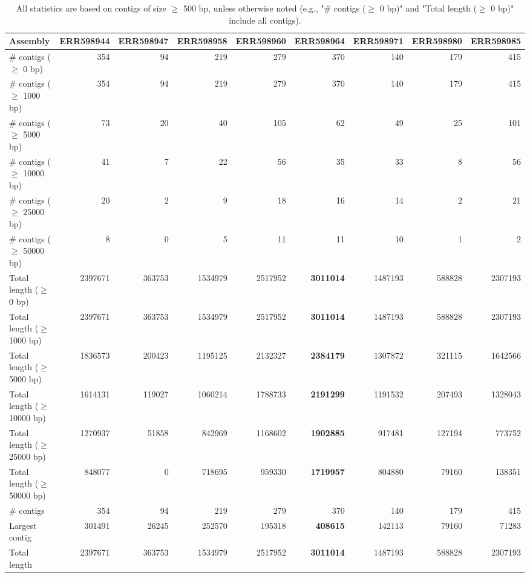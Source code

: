 \documentclass[12pt,a4paper]{article}
\begin{document}
\begin{table}[ht]
\begin{center}
\caption{All statistics are based on contigs of size $\geq$ 500 bp, unless otherwise noted (e.g., "\# contigs ($\geq$ 0 bp)" and "Total length ($\geq$ 0 bp)" include all contigs).}
\begin{tabular}{|l*{8}{|r}|}
\hline
Assembly & ERR598944 & ERR598947 & ERR598958 & ERR598960 & ERR598964 & ERR598971 & ERR598980 & ERR598985 \\ \hline
\# contigs ($\geq$ 0 bp) & 354 & 94 & 219 & 279 & 370 & 140 & 179 & 415 \\ \hline
\# contigs ($\geq$ 1000 bp) & 354 & 94 & 219 & 279 & 370 & 140 & 179 & 415 \\ \hline
\# contigs ($\geq$ 5000 bp) & 73 & 20 & 40 & 105 & 62 & 49 & 25 & 101 \\ \hline
\# contigs ($\geq$ 10000 bp) & 41 & 7 & 22 & 56 & 35 & 33 & 8 & 56 \\ \hline
\# contigs ($\geq$ 25000 bp) & 20 & 2 & 9 & 18 & 16 & 14 & 2 & 21 \\ \hline
\# contigs ($\geq$ 50000 bp) & 8 & 0 & 5 & 11 & 11 & 10 & 1 & 2 \\ \hline
Total length ($\geq$ 0 bp) & 2397671 & 363753 & 1534979 & 2517952 & {\bf 3011014} & 1487193 & 588828 & 2307193 \\ \hline
Total length ($\geq$ 1000 bp) & 2397671 & 363753 & 1534979 & 2517952 & {\bf 3011014} & 1487193 & 588828 & 2307193 \\ \hline
Total length ($\geq$ 5000 bp) & 1836573 & 200423 & 1195125 & 2132327 & {\bf 2384179} & 1307872 & 321115 & 1642566 \\ \hline
Total length ($\geq$ 10000 bp) & 1614131 & 119027 & 1060214 & 1788733 & {\bf 2191299} & 1191532 & 207493 & 1328043 \\ \hline
Total length ($\geq$ 25000 bp) & 1270937 & 51858 & 842969 & 1168602 & {\bf 1902885} & 917481 & 127194 & 773752 \\ \hline
Total length ($\geq$ 50000 bp) & 848077 & 0 & 718695 & 959330 & {\bf 1719957} & 804880 & 79160 & 138351 \\ \hline
\# contigs & 354 & 94 & 219 & 279 & 370 & 140 & 179 & 415 \\ \hline
Largest contig & 301491 & 26245 & 252570 & 195318 & {\bf 408615} & 142113 & 79160 & 71283 \\ \hline
Total length & 2397671 & 363753 & 1534979 & 2517952 & {\bf 3011014} & 1487193 & 588828 & 2307193 \\ \hline

\end{tabular}
\end{center}
\end{table}
\end{document}
